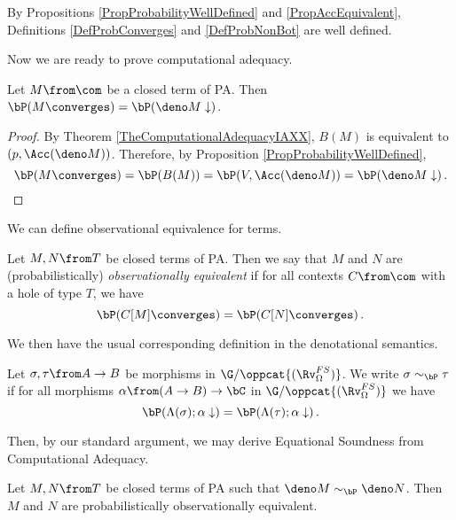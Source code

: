 \begin{remark}
  By Propositions \ref{PropProbabilityWellDefined} and \ref{PropAccEquivalent}, Definitions \ref{DefProbConverges} and \ref{DefProbNonBot} are well defined.
\end{remark}

Now we are ready to prove computational adequacy.

\begin{proposition}
  Let $M\from \com$ be a closed term of PA.  
  Then $\bP(M\converges) = \bP(\deno M \downarrow)$.
  \label{PropComputationalAdequacyPa}
\end{proposition}
\begin{proof}
  By Theorem \ref{TheComputationalAdequacyIAXX}, $B(M)$ is equivalent to $(p,\Acc(\deno M))$.  
  Therefore, by Proposition \ref{PropProbabilityWellDefined}, 
  \[
    \bP(M\converges) = \bP(B(M)) = \bP(V,\Acc(\deno M)) = \bP(\deno M\downarrow)\,.\qedhere
    \]
\end{proof}

We can define observational equivalence for terms.

\begin{definition}
  Let $M,N\from T$ be closed terms of PA.  
  Then we say that $M$ and $N$ are (probabilistically) \emph{observationally equivalent} if for all contexts $C\from \com$ with a hole of type $T$, we have
  \[
    \bP(C[M]\converges) = \bP(C[N]\converges)\,.
    \]
\end{definition}

We then have the usual corresponding definition in the denotational semantics.

\begin{definition}
  Let $\sigma,\tau\from A \to B$ be morphisms in $\G/\oppcat{(\Rv_\Omega^{FS})}$.  
  We write $\sigma\sim_{\bP}\tau$ if for all morphisms $\alpha \from (A \to B) \to \bC$ in $\G/\oppcat{(\Rv_\Omega^{FS})}$ we have
  \[
    \bP(\Lambda(\sigma);\alpha\downarrow) = \bP(\Lambda(\tau);\alpha\downarrow)\,.
    \]
\end{definition}

Then, by our standard argument, we may derive Equational Soundness from Computational Adequacy.

\begin{proposition}
  Let $M,N\from T$ be closed terms of PA such that $\deno M \sim_{\bP} \deno N$.  
  Then $M$ and $N$ are probabilistically observationally equivalent.
\end{proposition}

